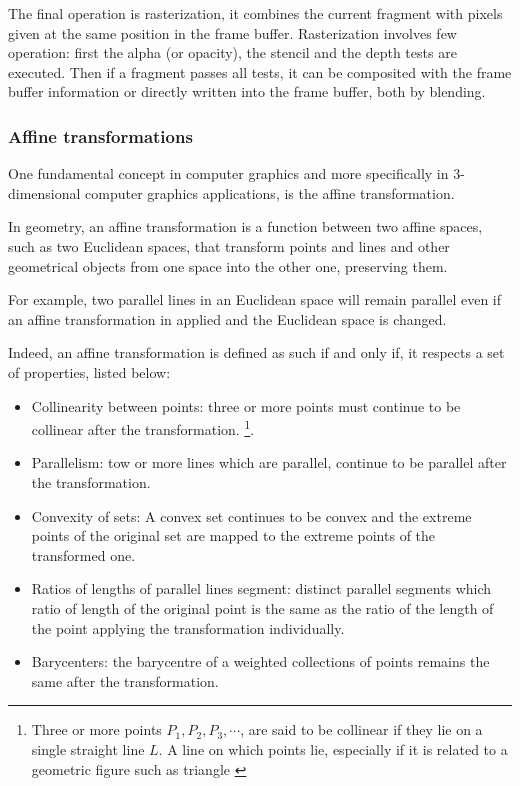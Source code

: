 \documentclass[12pt,a4paper]{extarticle}
\newcommand{\linespace}{\vspace{8pt}}
\begin{document}
The final operation is rasterization, it combines the current fragment with pixels given at the same position in the frame buffer. Rasterization involves few operation: first the alpha (or opacity), the stencil and the depth tests are executed. Then if a fragment passes all tests, it can be composited with the frame buffer information or directly written into the frame buffer, both by blending.
\subsubsection{Affine transformations}
One fundamental concept in computer graphics and more specifically in 3-dimensional computer graphics applications, is the affine transformation.
\linespace

In geometry, an affine transformation is a function between two affine spaces, such as two Euclidean spaces, that transform points and lines and other geometrical objects from one space into the other one, preserving them. 

For example, two parallel lines in an Euclidean space will remain parallel even if an affine transformation in applied and the Euclidean space is changed.

Indeed, an affine transformation is defined as such if and only if, it respects a set of properties, listed below:
\begin{itemize}
\item Collinearity between points: three or more points must continue to be collinear after the transformation. \footnote{Three or more points $P_{1},P_{2},P_{3},\cdots$, are said to be collinear if they lie on a single straight line $L$. A line on which points lie, especially if it is related to a geometric figure such as triangle  \cite{Weisstein2019Aug}}.
\item Parallelism: tow or more lines which are parallel, continue to be parallel after the transformation.
\item Convexity of sets: A convex set continues to be convex and the extreme points of the original set are mapped to the extreme points of the transformed one.
\item Ratios of lengths of parallel lines segment: distinct parallel segments which ratio of length of the original point is the same as the ratio of the length of the point applying the transformation individually.
\item Barycenters: the barycentre of a weighted collections of points remains the same after the transformation.
\end{itemize}
\end{document}

